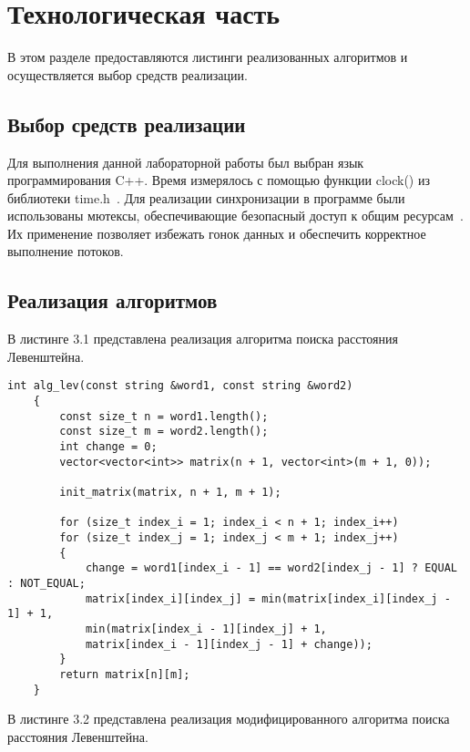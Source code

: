 \chapter{Технологическая часть}

В этом разделе предоставляются листинги реализованных алгоритмов и
осуществляется выбор средств реализации.

\section{Выбор средств реализации}

Для выполнения данной лабораторной работы был выбран язык программирования C++. 
Время измерялось с помощью функции clock() из библиотеки time.h~\cite{clock_t}.
Для реализации синхронизации в программе были использованы мютексы, обеспечивающие безопасный доступ к общим ресурсам~\cite{mutex}.
Их применение позволяет избежать гонок данных и обеспечить корректное выполнение потоков.


\section{Реализация алгоритмов}

В листинге 3.1 представлена реализация алгоритма поиска расстояния Левенштейна.

\clearpage

\begin{lstlisting}[caption=Алгоритм поиска расстояния Левенштейна]
	int alg_lev(const string &word1, const string &word2)
	{
		const size_t n = word1.length();
		const size_t m = word2.length();
		int change = 0; 
		vector<vector<int>> matrix(n + 1, vector<int>(m + 1, 0));
		
		init_matrix(matrix, n + 1, m + 1);
		
		for (size_t index_i = 1; index_i < n + 1; index_i++)
		for (size_t index_j = 1; index_j < m + 1; index_j++)
		{
			change = word1[index_i - 1] == word2[index_j - 1] ? EQUAL : NOT_EQUAL;
			matrix[index_i][index_j] = min(matrix[index_i][index_j - 1] + 1,
			min(matrix[index_i - 1][index_j] + 1,
			matrix[index_i - 1][index_j - 1] + change));
		}
		return matrix[n][m];
	}
\end{lstlisting}

\clearpage

В листинге 3.2 представлена реализация модифицированного алгоритма поиска расстояния Левенштейна.

